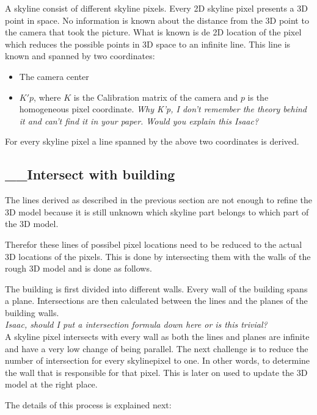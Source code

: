 \documentclass[10pt]{article}
\begin{document}
A skyline consist of different skyline pixels. Every 2D skyline pixel presents a 3D point in space. No
information is known about the distance from the 3D point to the camera that
took the picture. What is known is de 2D location of the pixel which reduces the possible points in 3D
space to an infinite line.  This line is known and spanned by two 
coordinates:\\ 
\begin{itemize}
	\item The camera center %
	\item $K'p$, where $K$ is the Calibration matrix of the camera and $p$ is the homogeneous pixel coordinate.
	\textit{Why K'p, I don't remember the theory behind it and can't find it in your paper. Would you explain this Isaac?}
\end{itemize}


For every skyline pixel a line spanned by the above two coordinates is derived.


\subsection{__Intersect with building}
The lines derived as described in the previous section are not enough to refine
the 3D model because it is still unknown which skyline part belongs to which
part of the 3D model.

Therefor these lines of possibel pixel locations need to
be reduced to the actual 3D locations of the pixels.  This is done by intersecting
them with the walls of the rough 3D model and is done as follows.

The building is first divided into different walls.  Every wall of the building spans a plane. 
Intersections are then calculated between the lines and the planes of the building walls.\\
\textit{Isaac, should I put a intersection formula down here or is this trivial?}\\

A skyline pixel intersects with every wall as both the lines and planes are
infinite and have a very low change of being parallel.
The next challenge is to reduce the number of intersection for every skylinepixel
to one. In other words, to determine the wall that is responsible for that pixel. 
This is later on used to update the 3D model at the right place.

The details of this process is explained next:
\end{document}

